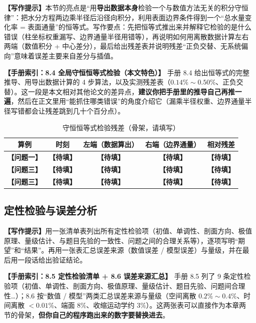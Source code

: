 \documentclass[12pt,a4paper]{article}
\newcommand{\prompt}[1]{\par\noindent\textbf{【写作提示】}#1\par}      %
\newcommand{\ph}[1]{\textbf{【#1】}}                                   %
\newcommand{\handbook}[2]{\par\noindent\textbf{【手册索引：#1】} #2\par}
\begin{document}
\prompt{本节的亮点是“用\textbf{导出数据本身}检验一个与数值方法无关的积分守恒律”：把水分方程两边乘半径后沿径向积分，利用表面边界条件得到一个“总水量变化率 = 表面通量”的恒等式。写作要点：先把恒等式推出来并解释它检验的是什么错误（柱坐标权重漏写、边界通量半径用错等），再说明如何用离散数据计算左右两端（数值积分 + 中心差分），最后给出残差表并说明残差“正负交替、无系统偏向”意味着误差主要来自差分与插值。}

\handbook{8.4 全局守恒恒等式检验（本文特色）}{手册 8.4 给出恒等式的完整推导、用导出数据计算的 4 步算法，以及实测残差表（$0.14\%\sim0.50\%$、正负交替）。这一段是本文相对其他论文的差异点，\textbf{建议你把手册里的推导自己再推一遍}，然后在正文里用“能抓住哪类错误”的角度介绍它（漏乘半径权重、边界通量半径写错都会让残差跳到几十个百分点）。}

\begin{table}[H]
\centering
\caption{守恒恒等式检验残差（骨架，请填写）}
\label{tab:balance}
\begin{tabular}{ccccc}
\toprule
算例 & 时刻 & 左端（数据算出） & 右端（边界通量） & 相对残差\\
\midrule
\ph{问题一} & \ph{待填} & \ph{待填} & \ph{待填} & \ph{待填}\\
\ph{问题三} & \ph{待填} & \ph{待填} & \ph{待填} & \ph{待填}\\
\ph{问题三} & \ph{待填} & \ph{待填} & \ph{待填} & \ph{待填}\\
\bottomrule
\end{tabular}
\end{table}

\subsection{定性检验与误差分析}

\prompt{用一张清单表列出所有定性检验项（初值、单调性、剖面方向、极值原理、量级估计、与题目先验的一致性、问题之间的合理关系等），逐项写明“期望”和“结果”。再用一张表汇总误差来源（数值误差 / 模型误差）与量级，并在最后用一段话给出验证结论。}

\handbook{8.5 定性检验清单 + 8.6 误差来源汇总}{手册 8.5 列了 9 条定性检验项（初值、单调性、剖面方向、极值原理、量级估计、题目先验、问题间合理性…）；8.6 按“数值 / 模型”两类汇总误差来源与量级（空间离散 $0.2\%\sim0.4\%$、时间离散 $<0.01\%$、端面 $8\%$、收缩运动学约 $3\%$）。这两张表可以直接作为本章两节的骨架，\textbf{但你自己的程序跑出来的数字要替换进去}。}
\end{document}
